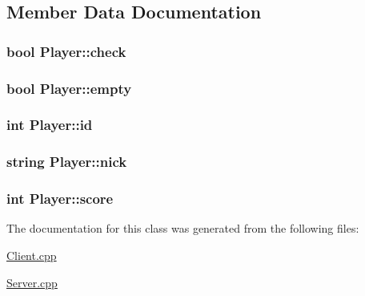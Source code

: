 \subsection{Member Data Documentation}
\hypertarget{classPlayer_a1b72316124caf757250c3cee1c4416ff}{
\subsubsection[{check}]{\setlength{\rightskip}{0pt plus 5cm}bool Player\-::check}}\label{classPlayer_a1b72316124caf757250c3cee1c4416ff}
\hypertarget{classPlayer_a8039b9f17594c036c3bd7b676a24b19e}{
\subsubsection[{empty}]{\setlength{\rightskip}{0pt plus 5cm}bool Player\-::empty}}\label{classPlayer_a8039b9f17594c036c3bd7b676a24b19e}
\hypertarget{classPlayer_a05e05f3a23de78da7ec032ec2bcf8c6c}{
\subsubsection[{id}]{\setlength{\rightskip}{0pt plus 5cm}int Player\-::id}}\label{classPlayer_a05e05f3a23de78da7ec032ec2bcf8c6c}
\hypertarget{classPlayer_aea2f8abddadf8deb423a3c9b507d1ccc}{
\subsubsection[{nick}]{\setlength{\rightskip}{0pt plus 5cm}string Player\-::nick}}\label{classPlayer_aea2f8abddadf8deb423a3c9b507d1ccc}
\hypertarget{classPlayer_ace6abae8d66534ad0a1fd6458f786a6e}{
\subsubsection[{score}]{\setlength{\rightskip}{0pt plus 5cm}int Player\-::score}}\label{classPlayer_ace6abae8d66534ad0a1fd6458f786a6e}


The documentation for this class was generated from the following files\-:\begin{DoxyCompactItemize}
\item 
\hyperlink{Client_8cpp}{Client.\-cpp}\item 
\hyperlink{Server_8cpp}{Server.\-cpp}\end{DoxyCompactItemize}
